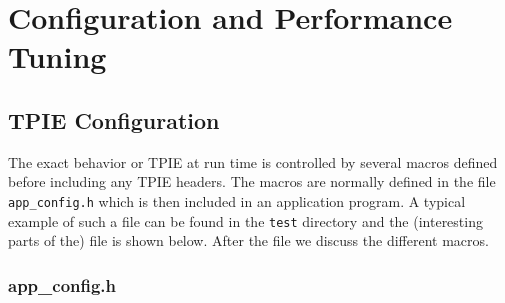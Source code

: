\chapter{Configuration and Performance Tuning}
\label{sec:tuning}


\section{TPIE Configuration}
\label{sec:configuration}


The exact behavior or TPIE at run time is controlled by several macros
defined before including any TPIE headers. The macros are normally defined
in the file \verb|app_config.h|
which is then included in an application
program. A typical example of such a file can be found in the \verb|test|
directory and the (interesting parts of the) file is shown below. After
the file we discuss the different macros.

\subsection{app\_config.h}

